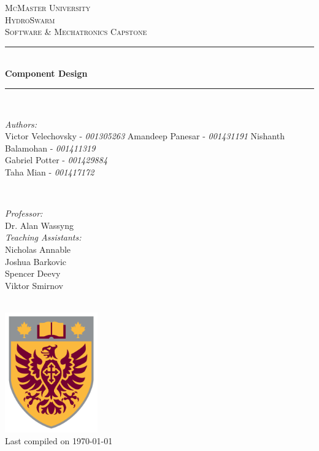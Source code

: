 \documentclass[11pt]{article}
\begin{document}
\begin{titlepage}
	\newcommand{\HRule}{\rule{\linewidth}{0.2mm}}
	\begin{center}
	\textsc{\LARGE McMaster University}\\[1.5cm]

	\textsc{\Large HydroSwarm}\\[0.5cm]
	\textsc{\large Software \& Mechatronics Capstone}\\[0.5cm]

	\HRule\\[0.4cm]
		{\huge\bfseries Component Design}\\[0.4cm]
	\HRule\\[0.4cm]

	\begin{minipage}[t][][t]{0.5\textwidth}
		\begin{flushleft} \large
			\emph{Authors:}\\
			Victor Velechovsky - \textit{001305263}
			Amandeep Panesar - \textit{001431191}
			Nishanth Balamohan - \textit{001411319} \\
			Gabriel Potter - \textit{001429884} \\
			Taha Mian - \textit{001417172}
		\end{flushleft}
	\end{minipage}
	~
	\begin{minipage}[t][][t]{0.4\textwidth}
		\begin{flushright} \large
			\emph{Professor:} \\
			Dr. Alan Wassyng \\[0.4cm]
			\emph{Teaching Assistants:} \\
			Nicholas Annable \\
			Joshua Barkovic \\
			Spencer Deevy \\
			Viktor Smirnov
		\end{flushright}
	\end{minipage}\\[2cm]

	\includegraphics[width=0.3\textwidth]{img/logo.png} \\
	{\large Last compiled on \today}
	\end{center}

\end{titlepage}
\end{document}
